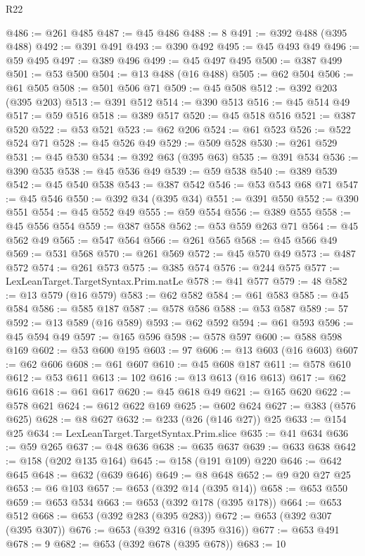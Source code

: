 \begin{lexlean}{R22}
\begin{coremodule}
@486 := @261 @485
@487 := @45 @486
@488 := 8
@491 := @392 @488 (@395 @488)
@492 := @391 @491
@493 := @390 @492
@495 := @45 @493 @49
@496 := @59 @495
@497 := @389 @496
@499 := @45 @497 @495
@500 := @387 @499
@501 := @53 @500
@504 := @13 @488 (@16 @488)
@505 := @62 @504
@506 := @61 @505
@508 := @501 @506 @71
@509 := @45 @508
@512 := @392 @203 (@395 @203)
@513 := @391 @512
@514 := @390 @513
@516 := @45 @514 @49
@517 := @59 @516
@518 := @389 @517
@520 := @45 @518 @516
@521 := @387 @520
@522 := @53 @521
@523 := @62 @206
@524 := @61 @523
@526 := @522 @524 @71
@528 := @45 @526 @49
@529 := @509 @528
@530 := @261 @529
@531 := @45 @530
@534 := @392 @63 (@395 @63)
@535 := @391 @534
@536 := @390 @535
@538 := @45 @536 @49
@539 := @59 @538
@540 := @389 @539
@542 := @45 @540 @538
@543 := @387 @542
@546 := @53 @543 @68 @71
@547 := @45 @546
@550 := @392 @34 (@395 @34)
@551 := @391 @550
@552 := @390 @551
@554 := @45 @552 @49
@555 := @59 @554
@556 := @389 @555
@558 := @45 @556 @554
@559 := @387 @558
@562 := @53 @559 @263 @71
@564 := @45 @562 @49
@565 := @547 @564
@566 := @261 @565
@568 := @45 @566 @49
@569 := @531 @568
@570 := @261 @569
@572 := @45 @570 @49
@573 := @487 @572
@574 := @261 @573
@575 := @385 @574
@576 := @244 @575
@577 := LexLeanTarget.TargetSyntax.Prim.natLe
@578 := @41 @577
@579 := 48
@582 := @13 @579 (@16 @579)
@583 := @62 @582
@584 := @61 @583
@585 := @45 @584
@586 := @585 @187
@587 := @578 @586
@588 := @53 @587
@589 := 57
@592 := @13 @589 (@16 @589)
@593 := @62 @592
@594 := @61 @593
@596 := @45 @594 @49
@597 := @165 @596
@598 := @578 @597
@600 := @588 @598 @169
@602 := @53 @600 @195
@603 := 97
@606 := @13 @603 (@16 @603)
@607 := @62 @606
@608 := @61 @607
@610 := @45 @608 @187
@611 := @578 @610
@612 := @53 @611
@613 := 102
@616 := @13 @613 (@16 @613)
@617 := @62 @616
@618 := @61 @617
@620 := @45 @618 @49
@621 := @165 @620
@622 := @578 @621
@624 := @612 @622 @169
@625 := @602 @624
@627 := @383 (@576 @625)
@628 := @8 @627
@632 := @233 (@26 (@146 @27)) @25
@633 := @154 @25
@634 := LexLeanTarget.TargetSyntax.Prim.slice
@635 := @41 @634
@636 := @59 @265
@637 := @48 @636
@638 := @635 @637
@639 := @633 @638
@642 := @158 (@202 @135 @164)
@645 := @158 (@191 @109) @220
@646 := @642 @645
@648 := @632 (@639 @646)
@649 := @8 @648
@652 := @9 @20 @27 @25
@653 := @6 @103
@657 := @653 (@392 @14 (@395 @14))
@658 := @653 @550
@659 := @653 @534
@663 := @653 (@392 @178 (@395 @178))
@664 := @653 @512
@668 := @653 (@392 @283 (@395 @283))
@672 := @653 (@392 @307 (@395 @307))
@676 := @653 (@392 @316 (@395 @316))
@677 := @653 @491
@678 := 9
@682 := @653 (@392 @678 (@395 @678))
@683 := 10

\end{coremodule}
\end{lexlean}
